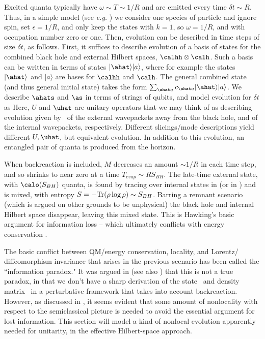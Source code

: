 Excited quanta typically have $\omega\sim T\sim 1/R$ and are emitted every time $\delta t\sim R$.  Thus, in a simple model (see {\it e.g.} \Mathurrev) we consider one species of particle and ignore spin, set $\epsilon=1/R$, and only keep the states with $k=1$, so $\omega=1/R$, and with occupation number zero or one.  Then, evolution can be described in time steps of size $\delta t$, as follows.  First, it suffices to describe evolution of a basis of states for the combined black hole and external Hilbert spaces, $\calhh\otimes\calh$.  Such a basis can be written in terms of states $|\ahat\rangle|a\rangle$, where for example the states $|\ahat\rangle$ and $|a\rangle$ are bases for $\calhh$ and $\calh$.   The general combined state (and thus general initial state) takes the form $\sum_{\ahat a} c_{\ahat a} |\ahat\rangle|a\rangle$.  We describe $\ahats$ and $\as$ in terms of strings of qubits, and model evolution for $\delta t$ as
%
\eqn{}
%
Here, $U$ and $\uhat$ are unitary operators that we may think of as describing evolution given by \hamil\ of the external wavepackets away from the black hole, and of the internal wavepackets, respectively.  Different slicings/mode descriptions yield different $U,\uhat$, but equivalent evolution.  In addition to this evolution, an entangled pair of quanta is produced from the horizon.

When backreaction is included, $M$ decreases an amount $\sim 1/R$ in each time step, and so shrinks to near zero at a time $T_{evap}\sim RS_{BH}$.  The late-time external state, with $\calo(S_{BH})$ quanta, is found by tracing over internal states in \paircreate (or in \hawkstate)
%
\eqn{}
%
and  is mixed, with entropy $S=-{\rm Tr}(\rho\log\rho) \sim S_{BH}$. Barring a remnant scenario (which is argued on other grounds  to be unphysical) the black hole and internal Hilbert space disappear, leaving this mixed state.  This is Hawking's basic argument  for information loss -- which ultimately conflicts with energy conservation .



The basic conflict between QM/energy conservation, locality, and Lorentz/ \break
diffeomorphism invariance that arises in the previous scenario has been called the ``information paradox."  It was argued in   (see also  ) that this is not a true paradox, in that we don't have a sharp derivation of the state \hawkstate\ and density matrix \rhoout\ in a perturbative framework that takes into account backreaction.  However, as discussed in  , it seems evident that some amount of nonlocality with respect to the semiclassical picture is needed to avoid the essential argument for lost information.  This section will model a kind of nonlocal evolution apparently needed for unitarity, in the effective Hilbert-space approach.

